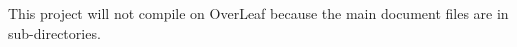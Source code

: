 \documentclass{article}
\begin{document}
This project will not compile on OverLeaf because the main document files are in sub-directories.
\end{document}
